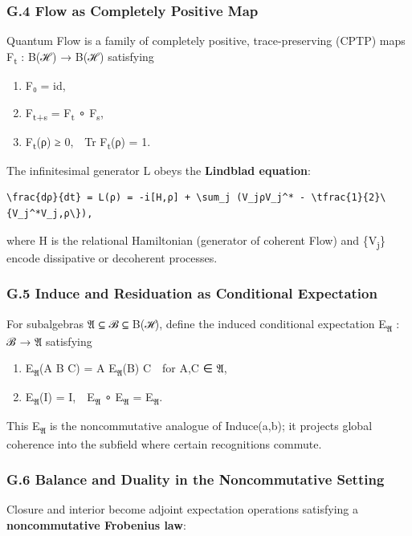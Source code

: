 \documentclass[11pt]{article}
\begin{document}
\subsubsection*{G.4 Flow as Completely Positive Map}
\label{sec:org7b8ad7c}
Quantum Flow is a family of completely positive, trace-preserving (CPTP) maps  
F\textsubscript{t} : B(ℋ) → B(ℋ) satisfying

\begin{enumerate}
\item F₀ = id,
\item F\textsubscript{t+s} = F\textsubscript{t} ∘ F\textsubscript{s},
\item F\textsubscript{t}(ρ) ≥ 0, Tr F\textsubscript{t}(ρ) = 1.
\end{enumerate}

The infinitesimal generator L obeys the \textbf{Lindblad equation}:

\begin{verbatim}
\frac{dρ}{dt} = L(ρ) = -i[H,ρ] + \sum_j (V_jρV_j^* - \tfrac{1}{2}\{V_j^*V_j,ρ\}),
\end{verbatim}

where H is the relational Hamiltonian (generator of coherent Flow)  
and \{V\textsubscript{j}\} encode dissipative or decoherent processes.
\subsubsection*{G.5 Induce and Residuation as Conditional Expectation}
\label{sec:org689192d}
For subalgebras 𝔄 ⊆ ℬ ⊆ B(ℋ),  
define the induced conditional expectation  
E\textsubscript{𝔄} : ℬ → 𝔄 satisfying

\begin{enumerate}
\item E\textsubscript{𝔄}(A B C) = A E\textsubscript{𝔄}(B) C for A,C ∈ 𝔄,
\item E\textsubscript{𝔄}(I) = I, E\textsubscript{𝔄} ∘ E\textsubscript{𝔄} = E\textsubscript{𝔄}.
\end{enumerate}

This E\textsubscript{𝔄} is the noncommutative analogue of Induce(a,b);  
it projects global coherence into the subfield where certain recognitions commute.
\subsubsection*{G.6 Balance and Duality in the Noncommutative Setting}
\label{sec:org2c3fc94}
Closure and interior become adjoint expectation operations  
satisfying a \textbf{noncommutative Frobenius law}:
\end{document}
